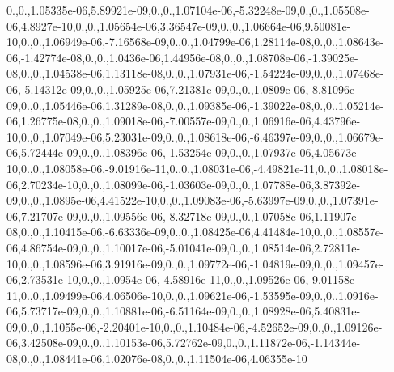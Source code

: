 \begin{DoxyCompactItemize}
0.,0.,1.\-05335e-\/06,5.\-89921e-\/09,0.,0.,1.\-07104e-\/06,-\/5.\-32248e-\/09,0.,0.,1.\-05508e-\/06,4.\-8927e-\/10,0.,0.,1.\-05654e-\/06,3.\-36547e-\/09,0.,0.,1.\-06664e-\/06,9.\-50081e-\/10,0.,0.,1.\-06949e-\/06,-\/7.\-16568e-\/09,0.,0.,1.\-04799e-\/06,1.\-28114e-\/08,0.,0.,1.\-08643e-\/06,-\/1.\-42774e-\/08,0.,0.,1.\-0436e-\/06,1.\-44956e-\/08,0.,0.,1.\-08708e-\/06,-\/1.\-39025e-\/08,0.,0.,1.\-04538e-\/06,1.\-13118e-\/08,0.,0.,1.\-07931e-\/06,-\/1.\-54224e-\/09,0.,0.,1.\-07468e-\/06,-\/5.\-14312e-\/09,0.,0.,1.\-05925e-\/06,7.\-21381e-\/09,0.,0.,1.\-0809e-\/06,-\/8.\-81096e-\/09,0.,0.,1.\-05446e-\/06,1.\-31289e-\/08,0.,0.,1.\-09385e-\/06,-\/1.\-39022e-\/08,0.,0.,1.\-05214e-\/06,1.\-26775e-\/08,0.,0.,1.\-09018e-\/06,-\/7.\-00557e-\/09,0.,0.,1.\-06916e-\/06,4.\-43796e-\/10,0.,0.,1.\-07049e-\/06,5.\-23031e-\/09,0.,0.,1.\-08618e-\/06,-\/6.\-46397e-\/09,0.,0.,1.\-06679e-\/06,5.\-72444e-\/09,0.,0.,1.\-08396e-\/06,-\/1.\-53254e-\/09,0.,0.,1.\-07937e-\/06,4.\-05673e-\/10,0.,0.,1.\-08058e-\/06,-\/9.\-01916e-\/11,0.,0.,1.\-08031e-\/06,-\/4.\-49821e-\/11,0.,0.,1.\-08018e-\/06,2.\-70234e-\/10,0.,0.,1.\-08099e-\/06,-\/1.\-03603e-\/09,0.,0.,1.\-07788e-\/06,3.\-87392e-\/09,0.,0.,1.\-0895e-\/06,4.\-41522e-\/10,0.,0.,1.\-09083e-\/06,-\/5.\-63997e-\/09,0.,0.,1.\-07391e-\/06,7.\-21707e-\/09,0.,0.,1.\-09556e-\/06,-\/8.\-32718e-\/09,0.,0.,1.\-07058e-\/06,1.\-11907e-\/08,0.,0.,1.\-10415e-\/06,-\/6.\-63336e-\/09,0.,0.,1.\-08425e-\/06,4.\-41484e-\/10,0.,0.,1.\-08557e-\/06,4.\-86754e-\/09,0.,0.,1.\-10017e-\/06,-\/5.\-01041e-\/09,0.,0.,1.\-08514e-\/06,2.\-72811e-\/10,0.,0.,1.\-08596e-\/06,3.\-91916e-\/09,0.,0.,1.\-09772e-\/06,-\/1.\-04819e-\/09,0.,0.,1.\-09457e-\/06,2.\-73531e-\/10,0.,0.,1.\-0954e-\/06,-\/4.\-58916e-\/11,0.,0.,1.\-09526e-\/06,-\/9.\-01158e-\/11,0.,0.,1.\-09499e-\/06,4.\-06506e-\/10,0.,0.,1.\-09621e-\/06,-\/1.\-53595e-\/09,0.,0.,1.\-0916e-\/06,5.\-73717e-\/09,0.,0.,1.\-10881e-\/06,-\/6.\-51164e-\/09,0.,0.,1.\-08928e-\/06,5.\-40831e-\/09,0.,0.,1.\-1055e-\/06,-\/2.\-20401e-\/10,0.,0.,1.\-10484e-\/06,-\/4.\-52652e-\/09,0.,0.,1.\-09126e-\/06,3.\-42508e-\/09,0.,0.,1.\-10153e-\/06,5.\-72762e-\/09,0.,0.,1.\-11872e-\/06,-\/1.\-14344e-\/08,0.,0.,1.\-08441e-\/06,1.\-02076e-\/08,0.,0.,1.\-11504e-\/06,4.\-06355e-\/10
\end{DoxyCompactItemize}
